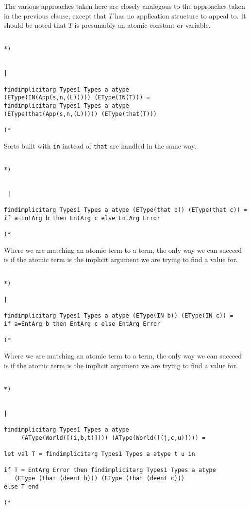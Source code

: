 \documentclass{article}
\begin{document}
The various approaches taken here are closely analogous to the approaches taken in the previous clause, except
that $T$ has no application structure to appeal to.  It should be noted that $T$ is presumably an atomic constant or variable.

\begin{verbatim}

*)


|

findimplicitarg Types1 Types a atype 
(EType(IN(App(s,n,(L))))) (EType(IN(T))) =
findimplicitarg Types1 Types a atype 
(EType(that(App(s,n,(L))))) (EType(that(T)))

(*

\end{verbatim}

Sorts built with {\tt in} instead of {\tt that} are handled in the same way.

\begin{verbatim}

*)


 |

findimplicitarg Types1 Types a atype (EType(that b)) (EType(that c)) = 
if a=EntArg b then EntArg c else EntArg Error

(*

\end{verbatim}

Where we are matching an atomic term to a term, the only way we can succeed is if the atomic term
is the implicit argument we are trying to find a value for.

\begin{verbatim}

*)

|

findimplicitarg Types1 Types a atype (EType(IN b)) (EType(IN c)) = 
if a=EntArg b then EntArg c else EntArg Error

(*

\end{verbatim}

Where we are matching an atomic term to a term, the only way we can succeed is if the atomic term
is the implicit argument we are trying to find a value for.

\begin{verbatim}

*)


|

findimplicitarg Types1 Types a atype 
     (AType(World([(i,b,t)]))) (AType(World([(j,c,u)]))) =

let val T = findimplicitarg Types1 Types a atype t u in

if T = EntArg Error then findimplicitarg Types1 Types a atype 
   (EType (that (deent b))) (EType (that (deent c))) 
else T end 

(*

\end{verbatim}
\end{document}
